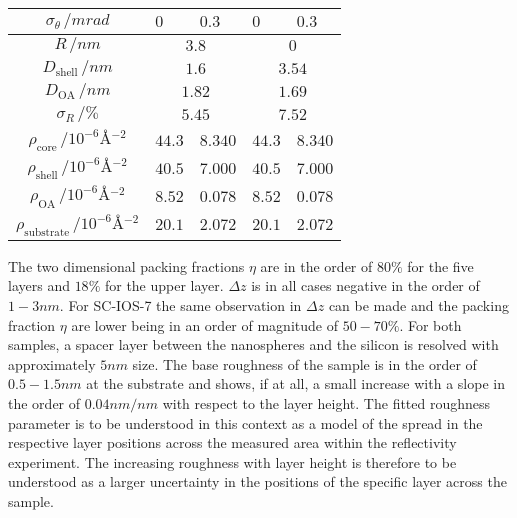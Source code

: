 \documentclass[\main/dresen_thesis.tex]{subfiles}
\begin{document}
\begin{table}[!htbp]
\begin{tabular}{ c | l | l | l | l}
       $\sigma_\theta \, / \unit{mrad}$                             & $0$       & $0.3$     & $0$       & $0.3$ \\
       \hline
       $R               \, / \unit{nm}$                               & \multicolumn{2}{c}{$3.8$}  & \multicolumn{2}{c}{$0$} \\
       $D_\mathrm{shell}\, / \unit{nm}$                               & \multicolumn{2}{c}{$1.6$}  & \multicolumn{2}{c}{$3.54$} \\
       $D_\mathrm{OA}   \, / \unit{nm}$                               & \multicolumn{2}{c}{$1.82$} & \multicolumn{2}{c}{$1.69$} \\
       $\sigma_R        \, / \unit{\%}$                               & \multicolumn{2}{c}{$5.45$} & \multicolumn{2}{c}{$7.52$} \\
       $\rho_\mathrm{core}\, / \unit{10^{-6} \angstrom^{-2}}      $   & $44.3$  & $8.340$ & $44.3$ & $8.340$\\
       $\rho_\mathrm{shell}\, / \unit{10^{-6} \angstrom^{-2}}      $  & $40.5$  & $7.000$ & $40.5$ & $7.000$\\
       $\rho_\mathrm{OA}\, / \unit{10^{-6} \angstrom^{-2}}     $      & $8.52$  & $0.078$ & $8.52$ & $0.078$\\
       $\rho_\mathrm{substrate}\, / \unit{10^{-6} \angstrom^{-2}} $   & $20.1$  & $2.072$ & $20.1$ & $2.072$\\
      \hline
    \end{tabular}
  \end{table}
  The two dimensional packing fractions $\eta$ are in the order of $80 \unit{\%}$ for the five layers and $18 \unit{\%}$ for the upper layer.
  $\Delta z$ is in all cases negative in the order of $1 - 3 \unit{nm}$.
  For SC-IOS-7 the same observation in $\Delta z$ can be made and the packing fraction $\eta$ are lower being in an order of magnitude of $50 - 70 \unit{\%}$.
  For both samples, a spacer layer between the nanospheres and the silicon is resolved with approximately $5 \unit{nm}$ size.
  The base roughness of the sample is in the order of $0.5 - 1.5 \unit{nm}$ at the substrate and shows, if at all, a small increase with a slope in the order of $0.04 \unit{nm / nm}$ with respect to the layer height.
  The fitted roughness parameter is to be understood in this context as a model of the spread in the respective layer positions across the measured area within the reflectivity experiment.
  The increasing roughness with layer height is therefore to be understood as a larger uncertainty in the positions of the specific layer across the sample.
\end{document}
